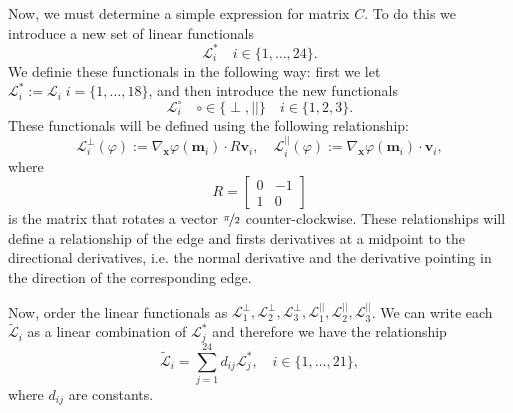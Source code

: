 Now, we must determine a simple expression for matrix $C$. To do this we
introduce a new set of linear functionals
\begin{equation*}
  \mathcal{L}^*_i \quad i\in\{1,\dots,24\}.
\end{equation*}
We definie these functionals in the following way: first we let
$\mathcal{L}^*_i:=\mathcal{L}_i\; i=\{1,\dots,18\}$, and then introduce the new
functionals
\begin{equation*}
  \mathcal{L}^\circ_i \quad \circ \in \{\perp,||\}\quad i\in \{1,2,3\}.
\end{equation*}
These functionals will be defined using the following relationship:
\begin{equation*}
  \mathcal{L}_i^{\perp}(\varphi) := \nabla_{\mathbf{x}} \varphi(\mathbf{m}_i)
    \cdot R\mathbf{v}_i, \quad
  \mathcal{L}^{||}_i (\varphi) := \nabla_{\mathbf{x}} \varphi(\mathbf{m}_i)
    \cdot \mathbf{v}_i,
\end{equation*}
where
\begin{equation*}
  R = \begin{bmatrix}
    0 & -1 \\ 1 & 0
  \end{bmatrix}
\end{equation*}
is the matrix that rotates a vector $\nicefrac{\pi}{2}$ counter-clockwise. These
relationships will define a relationship of the edge and firsts derivatives at a
midpoint to the directional derivatives, i.e. the normal derivative and the
derivative pointing in the direction of the corresponding edge.

Now, order the linear functionals as
$\mathcal{L}^{\perp}_1,\mathcal{L}^{\perp}_2,\mathcal{L}^{\perp}_3,
\mathcal{L}^{||}_1,\mathcal{L}^{||}_2,\mathcal{L}^{||}_3$.
We can write each $\tilde{\mathcal{L}}_i$ as a linear combination of
$\mathcal{L}_j^*$ and therefore we have the relationship
\begin{equation}
  \tilde{\mathcal{L}}_i = \sum_{j=1}^{24} d_{ij} \mathcal{L}^*_j, \quad
    i\in\{1,\dots,21\},
  \label{eqn:FunctionalsD}
\end{equation}
where $d_{ij}$ are constants.


